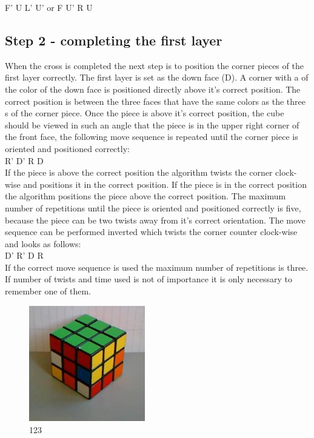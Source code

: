 F' U L' U' or F U' R U

\subsection{Step 2 - completing the first layer}
When the cross is completed the next step is to position the corner pieces of the first layer correctly. The first layer is set as the down face (D). A corner with a \facet{} of the color of the down face is positioned directly above it's correct  position. The correct position is between the three faces that have the same colors as the three \facet{}s of the corner piece. Once the piece is above it's correct position, the cube should be viewed in such an angle that the piece is in the upper right corner of the front face, the following move sequence is repeated until the corner piece is oriented and positioned correctly: \\

R' D' R D \\

If the piece is above the correct position the algorithm twists the corner clock-wise and positions it in the correct position. If the piece is in the correct position the algorithm positions the piece above the correct position. The maximum number of repetitions until the piece is oriented and positioned correctly is five, because the piece can be two twists away from it's correct orientation. 
The move sequence can be performed inverted which twists the corner counter clock-wise and looks as follows: \\

D' R' D R \\

If the correct move sequence is used the maximum number of repetitions is three. If number of twists and time used is not of importance it is only necessary to remember one of them.

\begin{figure}
\begin{center}
	\includegraphics[width=0.45\textwidth]{input/pics/2FL.jpg}	
\end{center}
\caption{123}
\label{fig:2FL}
\end{figure}


